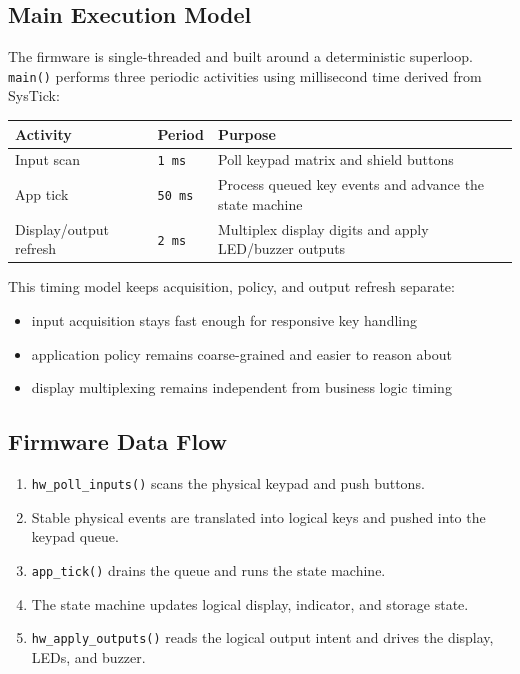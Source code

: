 \documentclass[11pt,a4paper]{article}
\begin{document}
\subsection{Main Execution Model}

The firmware is single-threaded and built around a deterministic superloop. \texttt{main()} performs
three periodic activities using millisecond time derived from SysTick:

\begin{tabularx}{\textwidth}{l l X}
\toprule
\textbf{Activity} & \textbf{Period} & \textbf{Purpose} \\
\midrule
Input scan & \texttt{1 ms} & Poll keypad matrix and shield buttons \\
App tick & \texttt{50 ms} & Process queued key events and advance the state machine \\
Display/output refresh & \texttt{2 ms} & Multiplex display digits and apply LED/buzzer outputs \\
\bottomrule
\end{tabularx}

This timing model keeps acquisition, policy, and output refresh separate:

\begin{itemize}[leftmargin=1.5em]
\item input acquisition stays fast enough for responsive key handling
\item application policy remains coarse-grained and easier to reason about
\item display multiplexing remains independent from business logic timing
\end{itemize}

\subsection{Firmware Data Flow}

\begin{enumerate}[leftmargin=1.7em]
\item \texttt{hw\_poll\_inputs()} scans the physical keypad and push buttons.
\item Stable physical events are translated into logical keys and pushed into the keypad queue.
\item \texttt{app\_tick()} drains the queue and runs the state machine.
\item The state machine updates logical display, indicator, and storage state.
\item \texttt{hw\_apply\_outputs()} reads the logical output intent and drives the display, LEDs, and buzzer.
\end{enumerate}
\end{document}
